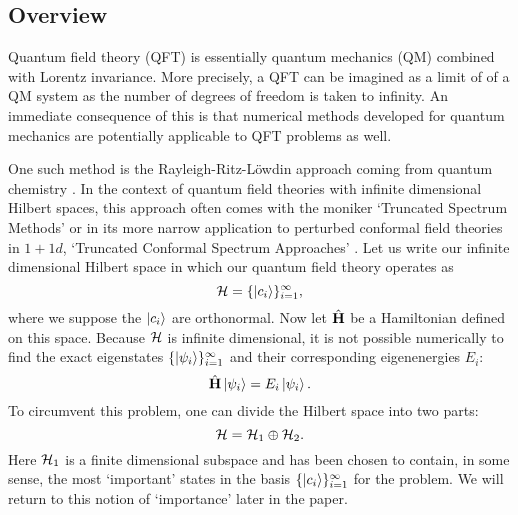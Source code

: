 \documentclass[twocolumn,secnumarabic,amssymb, nobibnotes, aps, prd]{revtex4-2}
\newcommand{\be}{\begin{equation}}
\newcommand{\ee}{\end{equation}}
\begin{document}
\subsection{Overview}
    Quantum field theory (QFT) is essentially quantum mechanics (QM) combined with Lorentz invariance.
More precisely, a QFT can be imagined as a limit of of a QM system as the number of
degrees of freedom is taken to infinity.
An immediate consequence of this is that numerical methods developed for quantum
mechanics are potentially applicable to QFT problems as well.


One such method is the Rayleigh-Ritz-L\"owdin approach coming from quantum chemistry \cite{lowdin,Klahn1977,Klahn1977a}.  In the context of quantum field theories with infinite dimensional Hilbert spaces, this approach often comes with the moniker `Truncated Spectrum Methods' or in its more narrow application to perturbed conformal field theories in $1+1d$, `Truncated Conformal Spectrum Approaches' \cite{yurov1990truncated,yurov1991truncated}. Let us write our infinite dimensional Hilbert space in which our quantum field theory operates as
\begin{equation}
    {\cal H} = \{\ket{c_i}\}^\infty_{i=1},
\end{equation}
where we suppose the $\ket{c_i}$ are orthonormal.
Now let $\hat{\bf H}$ be a Hamiltonian defined on this space.  Because ${\cal H}$ is infinite dimensional, it is not possible numerically to find the exact eigenstates $\{\ket{\psi_i}\}^\infty_{i=1}$ and their corresponding eigenenergies $E_i$:
\be
\hat {\bf H}\left|\psi_{i}\right\rangle=E_{i}\left|\psi_{i}\right\rangle.
\ee
To circumvent this problem, one can divide the Hilbert space into two parts:
\begin{equation}\label{hilbert_divide}
    {\cal H} = {\cal H}_1\oplus {\cal H}_2.
\end{equation}
Here ${\cal H}_1$ is a finite dimensional subspace and has been chosen to contain, in some sense, the most `important' states in the basis $\{\ket{c_i}\}^\infty_{i=1}$ for the problem.  We will return to this notion of `importance' later in the paper.
\end{document}
